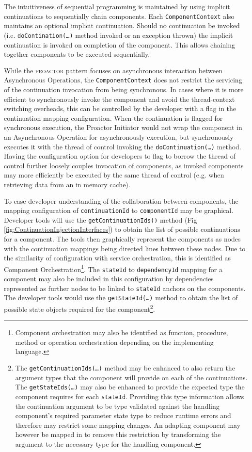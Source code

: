 \documentclass[prodmode]{style/acmlarge}
\begin{document}
The intuitiveness of sequential programming is maintained by using implicit
continuations \cite{continuations} to sequentially chain components.  Each
\texttt{ComponentContext} also maintains an optional implicit continuation. 
Should no continuation be invoked (i.e. \texttt{doContination(\ldots)} method
invoked or an exception thrown) the implicit continuation is invoked on
completion of the component.  This allows chaining together components to be
executed sequentially.

While the \textsc{proactor} pattern focuses on asynchronous interaction between
Asynchronous Operations, the \texttt{ComponentContext} does not restrict the
servicing of the continuation invocation from being synchronous.  In cases where
it is more efficient to synchronously invoke the component and avoid the
thread-context switching overheads, this can be controlled by the developer with
a flag in the continuation mapping configuration.  When the continuation is
flagged for synchronous execution, the Proactor Initiator would not wrap the
component in an Asynchronous Operation for asynchronously execution, but
synchronously executes it with the thread of control invoking the
\texttt{doContinuation(\ldots)} method.  Having the configuration option for developers
to flag to borrow the thread of control further loosely couples invocation of
components, as invoked components may more efficiently be executed by the same
thread of control (e.g. when retrieving data from an in memory cache).

To ease developer understanding of the collaboration between components, the
mapping configuration of \texttt{continuationId}  to \texttt{componentId} may be
graphical.  Developer tools will use the \texttt{getContinuationIds()} method
(Fig \ref{fig:ContinuationInjectionInterfaces}) to obtain the list of possible
continuations for a component.  The tools then graphically represent the
components as nodes with the continuation mappings being directed lines between
these nodes.  Due to the similarity of configuration with service orchestration,
this is identified as Component Orchestration\footnote{Component orchestration
may also be identified as function, procedure, method or operation orchestration
depending on the implementing language.}.  The \texttt{stateId} to
\texttt{dependencyId} mapping for a component may also be included in this
configuration by dependencies represented as further nodes to be linked to
\texttt{stateId} anchors on the components.  The developer tools would use the
\texttt{getStateId(\ldots)} method to obtain the list of possible state objects
required for the component\footnote{The \texttt{getContinuationIds(\ldots)}
method may be enhanced to also return the argument types that the component will
provide on each of the continuations.  The \texttt{getStateIds(\ldots)} may also
be enhanced to provide the expected type the component requires for each
\texttt{stateId}.  Providing this type information allows the continuation
argument to be type validated against the handling component's required
parameter state type to reduce runtime errors and therefore may restrict some
mapping changes.  An adapting component may however be mapped in to remove this
restriction by transforming the argument to the necessary type for the handling
component.}.
\end{document}
